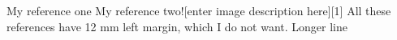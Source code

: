 \documentclass[xcolor={dvipsnames,table},11pt]{beamer}
\begin{document}
\begin{frame}
\begin{thebibliography}{plain}
\bibitem{} My reference one
\bibitem{} My reference two![enter image description here][1]
\bibitem{} All these references have 12 mm left margin, which I do not want. Longer line
\end{thebibliography}
\end{frame}
\end{document}
